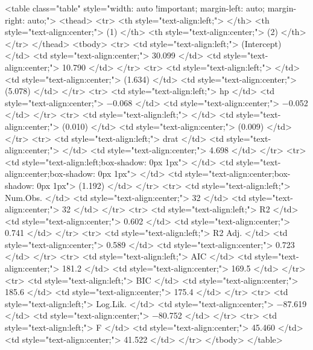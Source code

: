<table class="table" style="width: auto !important; margin-left: auto; margin-right: auto;">
 <thead>
  <tr>
   <th style="text-align:left;">   </th>
   <th style="text-align:center;"> (1) </th>
   <th style="text-align:center;"> (2) </th>
  </tr>
 </thead>
<tbody>
  <tr>
   <td style="text-align:left;"> (Intercept) </td>
   <td style="text-align:center;"> 30.099 </td>
   <td style="text-align:center;"> 10.790 </td>
  </tr>
  <tr>
   <td style="text-align:left;">  </td>
   <td style="text-align:center;"> (1.634) </td>
   <td style="text-align:center;"> (5.078) </td>
  </tr>
  <tr>
   <td style="text-align:left;"> hp </td>
   <td style="text-align:center;"> −0.068 </td>
   <td style="text-align:center;"> −0.052 </td>
  </tr>
  <tr>
   <td style="text-align:left;">  </td>
   <td style="text-align:center;"> (0.010) </td>
   <td style="text-align:center;"> (0.009) </td>
  </tr>
  <tr>
   <td style="text-align:left;"> drat </td>
   <td style="text-align:center;">  </td>
   <td style="text-align:center;"> 4.698 </td>
  </tr>
  <tr>
   <td style="text-align:left;box-shadow: 0px 1px">  </td>
   <td style="text-align:center;box-shadow: 0px 1px">  </td>
   <td style="text-align:center;box-shadow: 0px 1px"> (1.192) </td>
  </tr>
  <tr>
   <td style="text-align:left;"> Num.Obs. </td>
   <td style="text-align:center;"> 32 </td>
   <td style="text-align:center;"> 32 </td>
  </tr>
  <tr>
   <td style="text-align:left;"> R2 </td>
   <td style="text-align:center;"> 0.602 </td>
   <td style="text-align:center;"> 0.741 </td>
  </tr>
  <tr>
   <td style="text-align:left;"> R2 Adj. </td>
   <td style="text-align:center;"> 0.589 </td>
   <td style="text-align:center;"> 0.723 </td>
  </tr>
  <tr>
   <td style="text-align:left;"> AIC </td>
   <td style="text-align:center;"> 181.2 </td>
   <td style="text-align:center;"> 169.5 </td>
  </tr>
  <tr>
   <td style="text-align:left;"> BIC </td>
   <td style="text-align:center;"> 185.6 </td>
   <td style="text-align:center;"> 175.4 </td>
  </tr>
  <tr>
   <td style="text-align:left;"> Log.Lik. </td>
   <td style="text-align:center;"> −87.619 </td>
   <td style="text-align:center;"> −80.752 </td>
  </tr>
  <tr>
   <td style="text-align:left;"> F </td>
   <td style="text-align:center;"> 45.460 </td>
   <td style="text-align:center;"> 41.522 </td>
  </tr>
</tbody>
</table>
